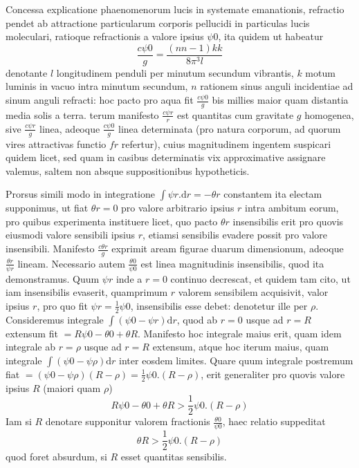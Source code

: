 \newcommand{\NearTau}{\mathord{\text{\fontspec{Times New Roman}τ}}}%
\expandafter\def\csname HistoricalNoteText6\endcsname{Concessa explicatione phaenomenorum lucis in systemate emanationis, refractio pendet ab attractione particularum corporis pellucidi in particulas lucis moleculari, ratioque refractionis a valore ipsius $\psi0$, ita quidem ut habeatur
\[
\frac{c\psi0}{g}=\frac{(nn-1)kk}{8\pi^3l}
\]
denotante $l$ longitudinem penduli per minutum secundum vibrantis, $k$ motum luminis in vacuo intra minutum secundum, $n$ rationem sinus anguli incidentiae ad sinum anguli refracti: hoc pacto pro aqua fit $\frac{c\psi0}{g}$ bis millies maior quam distantia media solis a terra.}%
terum manifesto $\frac{c\psi r}{r}$ est quantitas cum gravitate $g$ homogenea, sive $\frac{c\psi r}{g}$ linea, adeoque $\frac{c\psi0}{g}$ linea determinata (pro natura corporum, ad quorum vires attractivas functio $fr$ refertur), cuius magnitudinem ingentem suspicari quidem licet, sed quam in casibus determinatis vix approximative assignare valemus, saltem non absque suppositionibus hypotheticis.

Prorsus simili modo in integratione $\int\psi r.\mathrm{d}r=-\theta r$ constantem ita electam supponimus, ut fiat $\theta r=0$ pro valore arbitrario ipsius $r$ intra ambitum eorum, pro quibus experimenta instituere licet, quo pacto $\theta r$ insensibilis erit pro quovis eiusmodi valore sensibili ipsius $r$, etiamsi sensibilis evadere possit pro valore insensibili. Manifesto $\frac{c\theta r}{g}$ exprimit aream figurae duarum dimensionum, adeoque $\frac{\theta r}{\psi r}$ lineam. Necessario autem $\frac{\theta0}{\psi0}$ est linea magnitudinis insensibilis, quod ita demonstramus. Quum $\psi r$ inde a $r=0$ continuo decrescat, et quidem tam cito, ut iam insensibilis evaserit, quamprimum $r$ valorem sensibilem acquisivit, valor ipsius $r$, pro quo fit $\psi r=\frac12\psi0$, insensibilis esse debet: denotetur ille per $\rho$. Consideremus integrale $\int(\psi0-\psi r)\mathrm{d}r$, quod ab $r=0$ usque ad $r=R$ extensum fit $=R\psi0-\theta0+\theta R$. Manifesto hoc integrale maius erit, quam idem integrale ab $r=\rho$ usque ad $r=R$ extensum, atque hoc iterum maius, quam integrale $\int(\psi0-\psi\rho)\mathrm{d}r$ inter eosdem limites. Quare quum integrale postremum fiat $=(\psi0-\psi\rho)(R-\rho)=\frac12\psi0.(R-\rho)$, erit generaliter pro quovis valore ipsius $R$ (maiori quam $\rho$)
\[
R\psi0-\theta0+\theta R>\frac12\psi0.(R-\rho)
\]
Iam si $R$ denotare supponitur valorem fractionis $\frac{\theta0}{\psi0}$, haec relatio suppeditat
\[
\theta R>\frac12\psi0.(R-\rho)
\]
quod foret absurdum, si $R$ esset quantitas sensibilis.

